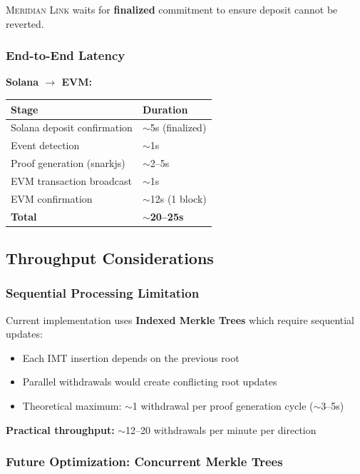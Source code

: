 \documentclass[11pt,a4paper,twoside]{article}
\newcommand{\protocol}{\textsc{Meridian Link}}
\begin{document}
\protocol{} waits for \textbf{finalized} commitment to ensure deposit cannot be reverted.

\subsubsection{End-to-End Latency}

\textbf{Solana $\rightarrow$ EVM:}
\begin{table}[H]
\centering
\begin{tabular}{@{}ll@{}}
\toprule
\textbf{Stage} & \textbf{Duration} \\
\midrule
Solana deposit confirmation & $\sim$5s (finalized) \\
Event detection & $\sim$1s \\
Proof generation (snarkjs) & $\sim$2--5s \\
EVM transaction broadcast & $\sim$1s \\
EVM confirmation & $\sim$12s (1 block) \\
\midrule
\textbf{Total} & $\sim$\textbf{20--25s} \\
\bottomrule
\end{tabular}
\end{table}

\subsection{Throughput Considerations}

\subsubsection{Sequential Processing Limitation}

Current implementation uses \textbf{Indexed Merkle Trees} which require sequential updates:
\begin{itemize}
    \item Each IMT insertion depends on the previous root
    \item Parallel withdrawals would create conflicting root updates
    \item Theoretical maximum: $\sim$1 withdrawal per proof generation cycle ($\sim$3--5s)
\end{itemize}

\textbf{Practical throughput:} $\sim$12--20 withdrawals per minute per direction

\subsubsection{Future Optimization: Concurrent Merkle Trees}
\end{document}
